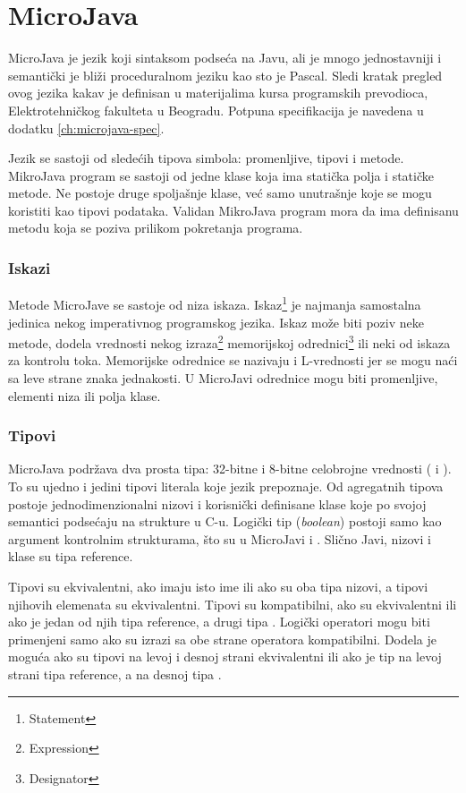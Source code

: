 
\chapter{MicroJava}
\label{ch:microjava}

MicroJava je jezik koji sintaksom podseća na Javu, ali je mnogo jednostavniji i semantički je bliži proceduralnom jeziku kao sto je Pascal.
Sledi kratak pregled ovog jezika kakav je definisan u materijalima kursa programskih prevodioca, Elektrotehničkog fakulteta u Beogradu\cite{ir4pp}. Potpuna specifikacija je navedena u dodatku \ref{ch:microjava-spec}.

Jezik se sastoji od sledećih tipova simbola: promenljive, tipovi i metode. 
MikroJava program se sastoji od jedne klase koja ima statička polja i statičke metode. 
Ne postoje druge spoljašnje klase, već samo unutrašnje koje se mogu koristiti kao tipovi podataka. 
Validan  MikroJava program mora da ima definisanu metodu  koja se poziva prilikom pokretanja programa.

\subsection*{Iskazi}

Metode MicroJave se sastoje od niza iskaza. 
Iskaz\footnote{\eng Statement} 
	je najmanja samostalna jedinica nekog imperativnog programskog jezika. 
Iskaz može biti poziv neke metode, dodela vrednosti nekog izraza\footnote{\eng Expression} 
	memorijskoj odrednici\footnote{\eng Designator} 
	ili neki od iskaza za kontrolu toka. 
Memorijske odrednice se nazivaju i L-vrednosti jer se mogu naći sa leve strane znaka jednakosti. 
U MicroJavi odrednice mogu biti promenljive, elementi niza ili polja klase.

\subsection*{Tipovi}

MicroJava podržava dva prosta tipa: 32-bitne i 8-bitne celobrojne vrednosti ( i ). 
To su ujedno i jedini tipovi literala koje jezik prepoznaje. 
Od agregatnih tipova postoje jednodimenzionalni nizovi i korisnički definisane klase koje po svojoj semantici podsećaju na strukture u C-u. 
Logički tip (\textit{boolean}) postoji samo kao argument kontrolnim strukturama, što su u MicroJavi  i . 
Slično Javi, nizovi i klase su tipa reference.

Tipovi su ekvivalentni, ako imaju isto ime ili ako su oba tipa nizovi, a tipovi njihovih elemenata su ekvivalentni. 
Tipovi su kompatibilni, ako su ekvivalentni ili ako je jedan od njih tipa reference, a drugi tipa . 
Logički operatori mogu biti primenjeni samo ako su izrazi sa obe strane operatora kompatibilni. 
Dodela je moguća ako su tipovi na levoj i desnoj strani ekvivalentni ili ako je tip na levoj strani tipa reference, a na desnoj tipa .

